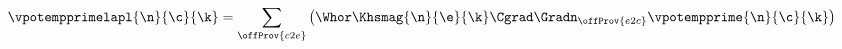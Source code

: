 $$\begin{aligned}
    & \vpotempprimelapl{\n}{\c}{\k} = \sum_{\offProv{c2e}} \left( \Whor \Khsmag{\n}{\e}{\k} \Cgrad \Gradn_{\offProv{e2c}} \vpotempprime{\n}{\c}{\k} \right)
\end{aligned}$$